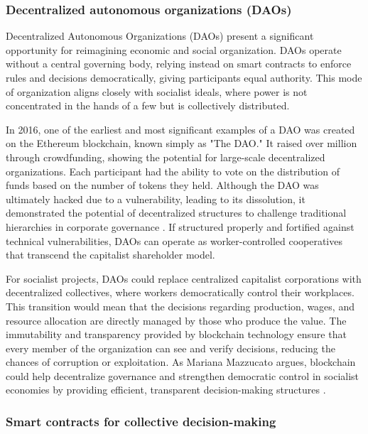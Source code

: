 \begin{refsection}
\subsubsection{Decentralized autonomous organizations (DAOs)}

Decentralized Autonomous Organizations (DAOs) present a significant opportunity for reimagining economic and social organization. DAOs operate without a central governing body, relying instead on smart contracts to enforce rules and decisions democratically, giving participants equal authority. This mode of organization aligns closely with socialist ideals, where power is not concentrated in the hands of a few but is collectively distributed.

In 2016, one of the earliest and most significant examples of a DAO was created on the Ethereum blockchain, known simply as "The DAO." It raised over  million through crowdfunding, showing the potential for large-scale decentralized organizations. Each participant had the ability to vote on the distribution of funds based on the number of tokens they held. Although the DAO was ultimately hacked due to a vulnerability, leading to its dissolution, it demonstrated the potential of decentralized structures to challenge traditional hierarchies in corporate governance \cite[pp.~189-192]{tapscott2016}. If structured properly and fortified against technical vulnerabilities, DAOs can operate as worker-controlled cooperatives that transcend the capitalist shareholder model.

For socialist projects, DAOs could replace centralized capitalist corporations with decentralized collectives, where workers democratically control their workplaces. This transition would mean that the decisions regarding production, wages, and resource allocation are directly managed by those who produce the value. The immutability and transparency provided by blockchain technology ensure that every member of the organization can see and verify decisions, reducing the chances of corruption or exploitation. As Mariana Mazzucato argues, blockchain could help decentralize governance and strengthen democratic control in socialist economies by providing efficient, transparent decision-making structures \cite[pp.~67-68]{mazzucato2023}.

\subsubsection{Smart contracts for collective decision-making}


\end{refsection}
